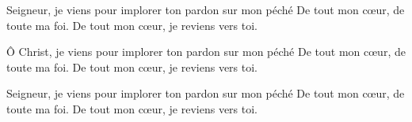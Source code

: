 Seigneur, je viens pour implorer ton pardon sur mon péché
De tout mon cœur, de toute ma foi. De tout mon cœur, je reviens vers toi.

Ô Christ, je viens pour implorer ton pardon sur mon péché 
De tout mon cœur, de toute ma foi. De tout mon cœur, je reviens vers toi.

Seigneur, je viens pour implorer ton pardon sur mon péché 
De tout mon cœur, de toute ma foi. De tout mon cœur, je reviens vers toi.

